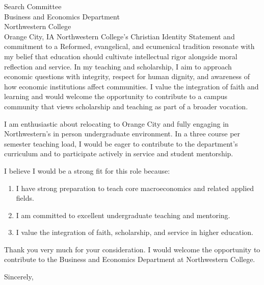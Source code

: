 \documentclass[11pt,letterpaper]{letter}
\begin{document}
\begin{letter}{
Search Committee \\
Business and Economics Department \\
Northwestern College \\
Orange City, IA
}
Northwestern College’s Christian Identity Statement and commitment to a Reformed, evangelical, and ecumenical tradition resonate with my belief that education should cultivate intellectual rigor alongside moral reflection and service. In my teaching and scholarship, I aim to approach economic questions with integrity, respect for human dignity, and awareness of how economic institutions affect communities. I value the integration of faith and learning and would welcome the opportunity to contribute to a campus community that views scholarship and teaching as part of a broader vocation.

I am enthusiastic about relocating to Orange City and fully engaging in Northwestern’s in person undergraduate environment. In a three course per semester teaching load, I would be eager to contribute to the department’s curriculum and to participate actively in service and student mentorship.

I believe I would be a strong fit for this role because:
\begin{enumerate}
    \item I have strong preparation to teach core macroeconomics and related applied fields.
    \item I am committed to excellent undergraduate teaching and mentoring.
    \item I value the integration of faith, scholarship, and service in higher education.
\end{enumerate}

Thank you very much for your consideration. I would welcome the opportunity to contribute to the Business and Economics Department at Northwestern College.

\closing{Sincerely,}

\end{letter}
\end{document}
